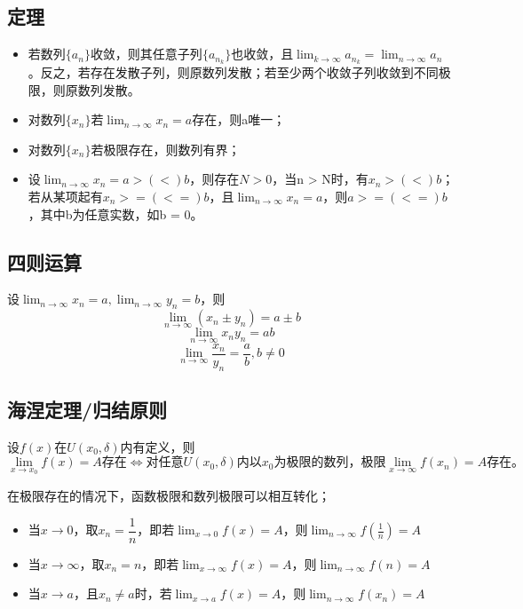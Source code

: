 \subsection{定理}
\begin{itemize}
    \item 若数列\(\{a_n\}\)收敛，则其任意子列\(\{a_{n_k}\}\)也收敛，且\(\displaystyle \lim_{k \to \infty}a_{n_k} = \lim_{n \to \infty}a_n\)。反之，若存在发散子列，则原数列发散；若至少两个收敛子列收敛到不同极限，则原数列发散。
    \item 对数列\(\{x_n\}\)若\(\displaystyle \lim_{n \to \infty}x_n = a\)存在，则a唯一；
    \item 对数列\(\{x_n\}\)若极限存在，则数列有界；
    \item 设\(\displaystyle \lim_{n \to \infty}x_n = a >(<) b\)，则存在\(N > 0\)，当n > N时，有\(x_n >(<) b\)；若从某项起有\(x_n >=(<=) b\)，且\(\lim_{n \to \infty}x_n = a\)，则\(a >=(<=) b\)，其中b为任意实数，如b = 0。
\end{itemize}


\subsection{四则运算}
设\(\displaystyle \lim_{n \to \infty}x_n = a, \lim_{n \to \infty}y_n = b\)，则
\[\lim_{n \to \infty}(x_n \pm y_n) = a \pm b\]
\[\lim_{n \to \infty}x_ny_n = ab\]
\[\lim_{n \to \infty}\dfrac{x_n}{y_n} = \dfrac{a}{b},b \neq 0\]


\subsection{海涅定理/归结原则}
设\(f(x)\)在\(U(x_0, \delta)\)内有定义，则
\[\displaystyle \lim_{x \to x_0}f(x) = A\text{存在} \Leftrightarrow \text{对任意}U(x_0, \delta)\text{内以}x_0\text{为极限的数列，极限}\lim_{x \to \infty}f(x_n) = A\text{存在。}\]

在极限存在的情况下，函数极限和数列极限可以相互转化；
\begin{itemize}
    \item 当\(x \to 0\)，取\(x_n = \dfrac{1}{n}\)，即若\(\displaystyle \lim_{x \to 0}f(x) = A\)，则\(\displaystyle \lim_{n \to \infty}f(\frac{1}{n}) = A\)
    \item 当\(x \to \infty\)，取\(x_n = n\)，即若\(\displaystyle \lim_{x \to \infty}f(x) = A\)，则\(\displaystyle \lim_{n \to \infty}f(n) = A\)
    \item 当\(x \to a\)，且\(x_n \neq a\)时，若\(\displaystyle \lim_{x \to a}f(x) = A\)，则\(\displaystyle \lim_{n \to \infty}f(x_n) = A\)
\end{itemize}


